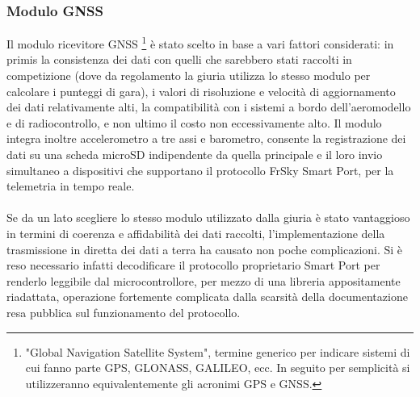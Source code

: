 \documentclass[12pt]{article}
\begin{document}
\subsubsection{Modulo GNSS}
Il modulo ricevitore GNSS \footnote{"Global Navigation Satellite System", termine generico per indicare sistemi di cui fanno parte GPS, GLONASS, GALILEO, ecc. In seguito per semplicità si utilizzeranno equivalentemente gli acronimi GPS e GNSS.} è stato scelto in base a vari fattori considerati: in primis la consistenza dei dati con quelli che sarebbero stati raccolti in competizione (dove da regolamento la giuria utilizza lo stesso modulo per calcolare i punteggi di gara), i valori di risoluzione e velocità di aggiornamento dei dati relativamente alti, la compatibilità con i sistemi a bordo dell'aeromodello e di radiocontrollo, e non ultimo il costo non eccessivamente alto. Il modulo integra inoltre accelerometro a tre assi e barometro, consente la registrazione dei dati su una scheda microSD indipendente da quella principale e il loro invio simultaneo a dispositivi che supportano il protocollo FrSky Smart Port, per la telemetria in tempo reale.
\\\\
Se da un lato scegliere lo stesso modulo utilizzato dalla giuria è stato vantaggioso in termini di coerenza e affidabilità dei dati raccolti, l'implementazione della trasmissione in diretta dei dati a terra ha causato non poche complicazioni. Si è reso necessario infatti decodificare il protocollo proprietario Smart Port per renderlo leggibile dal microcontrollore, per mezzo di una libreria appositamente riadattata, operazione fortemente complicata dalla scarsità della documentazione resa pubblica sul funzionamento del protocollo.
\end{document}
